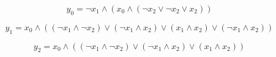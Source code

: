 \documentclass{scrartcl}
\begin{document}
	
$$y_0 =  \lnot x_1 \wedge (x_0 \wedge ( \lnot x_2 \lor  \lnot x_2 \lor x_2))$$

$$y_1 = x_0 \wedge (( \lnot x_1 \wedge  \lnot x_2) \lor ( \lnot x_1 \wedge x_2) \lor (x_1 \wedge x_2) \lor ( \lnot x_1 \wedge x_2))$$

$$y_2 = x_0 \wedge (( \lnot x_1 \wedge  \lnot x_2) \lor ( \lnot x_1 \wedge x_2) \lor (x_1 \wedge x_2))$$
\end{document}
